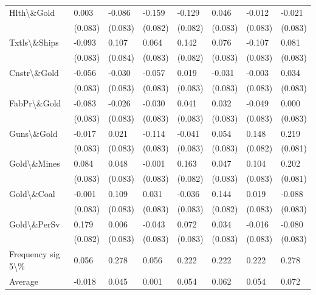 \begin{tabular}{l|l|l|l|l|l|l|l}
Hlth\textbackslash{}\&Gold & 0.003 & -0.086 & -0.159 & -0.129 & 0.046 & -0.012 & -0.021\\
 & (0.083) & (0.083) & (0.082) & (0.082) & (0.083) & (0.083) & (0.083)\\
Txtls\textbackslash{}\&Ships & -0.093 & 0.107 & 0.064 & 0.142 & 0.076 & -0.107 & 0.081\\
 & (0.083) & (0.084) & (0.083) & (0.082) & (0.083) & (0.083) & (0.083)\\
Cnstr\textbackslash{}\&Gold & -0.056 & -0.030 & -0.057 & 0.019 & -0.031 & -0.003 & 0.034\\
 & (0.083) & (0.083) & (0.083) & (0.083) & (0.083) & (0.083) & (0.083)\\
FabPr\textbackslash{}\&Gold & -0.083 & -0.026 & -0.030 & 0.041 & 0.032 & -0.049 & 0.000\\
 & (0.083) & (0.083) & (0.083) & (0.083) & (0.083) & (0.083) & (0.083)\\
Guns\textbackslash{}\&Gold & -0.017 & 0.021 & -0.114 & -0.041 & 0.054 & 0.148 & 0.219\\
 & (0.083) & (0.083) & (0.083) & (0.083) & (0.083) & (0.082) & (0.081)\\
Gold\textbackslash{}\&Mines & 0.084 & 0.048 & -0.001 & 0.163 & 0.047 & 0.104 & 0.202\\
 & (0.083) & (0.083) & (0.083) & (0.082) & (0.083) & (0.083) & (0.081)\\
Gold\textbackslash{}\&Coal & -0.001 & 0.109 & 0.031 & -0.036 & 0.144 & 0.019 & -0.088\\
 & (0.083) & (0.083) & (0.083) & (0.083) & (0.082) & (0.083) & (0.083)\\
Gold\textbackslash{}\&PerSv & 0.179 & 0.006 & -0.043 & 0.072 & 0.034 & -0.016 & -0.080\\
 & (0.082) & (0.083) & (0.083) & (0.083) & (0.083) & (0.083) & (0.083)\\
Frequency sig 5\textbackslash{}\% & 0.056 & 0.278 & 0.056 & 0.222 & 0.222 & 0.222 & 0.278\\
Average & -0.018 & 0.045 & 0.001 & 0.054 & 0.062 & 0.054 & 0.072\\
\hline
\end{tabular}
